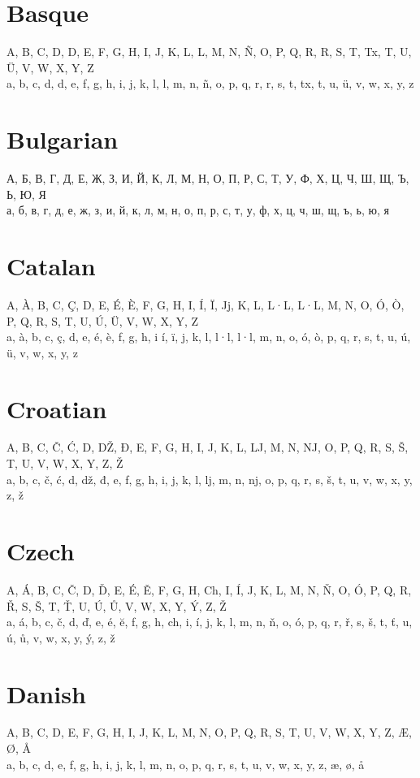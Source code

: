 \documentclass{article}
\begin{document}
\section{Basque}
A, B, C, D, D, E, F, G, H, I, J, K, L, L, M, N, Ñ, O, P, Q, R, R, S, T, Tx, T, U, Ü, V, W, X, Y, Z \\
a, b, c, d, d, e, f, g, h, i, j, k, l, l, m, n, ñ, o, p, q, r, r, s, t, tx, t, u, ü, v, w, x, y, z

\section{Bulgarian}
А, Б, В, Г, Д, Е, Ж, З, И, Й, К, Л, М, Н, О, П, Р, С, Т, У, Ф, Х, Ц, Ч, Ш, Щ, Ъ, Ь, Ю, Я \\
а, б, в, г, д, е, ж, з, и, й, к, л, м, н, о, п, р, с, т, у, ф, х, ц, ч, ш, щ, ъ, ь, ю, я

\section{Catalan}
A, À, B, C, Ç, D, E, É, È, F, G, H, I, Í, Ï, Jj, K, L, L·L, L·L, M, N, O, Ó, Ò, P, Q, R, S, T, U, Ú, Ü, V, W, X, Y, Z \\
a, à, b, c, ç, d, e, é, è, f, g, h, i í, ï, j, k, l, l·l, l·l, m, n, o, ó, ò, p, q, r, s, t, u, ú, ü, v, w, x, y, z

\section{Croatian}
A, B, C, Č, Ć, D, DŽ, Đ, E, F, G, H, I, J, K, L, LJ, M, N, NJ, O, P, Q, R, S, Š, T, U, V, W,  X, Y, Z, Ž \\
a, b, c, č, ć, d, dž, đ, e, f, g, h, i, j, k, l, lj, m, n, nj, o, p, q, r, s, š, t, u, v, w, x, y, z, ž

\section{Czech}
A, Á, B, C, Č, D, Ď, E, É, Ě, F, G, H, Ch, I, Í, J, K, L, M, N, Ň, O, Ó, P, Q, R, Ř, S, Š, T, Ť, U, Ú, Ů, V, W, X, Y, Ý, Z, Ž \\
a, á, b, c, č, d, ď, e, é, ĕ, f, g, h, ch, i, í, j, k, l, m, n, ň, o, ó, p, q, r, ř, s, š, t, ť, u, ú, ů, v, w, x, y, ý, z, ž

\section{Danish}
A, B, C, D, E, F, G, H, I, J, K, L, M, N, O, P, Q, R, S, T, U, V, W, X, Y, Z, Æ, Ø, Å \\
a, b, c, d, e, f, g, h, i, j, k, l, m, n, o, p, q, r, s, t, u, v, w, x, y, z, æ, ø, å
\end{document}
